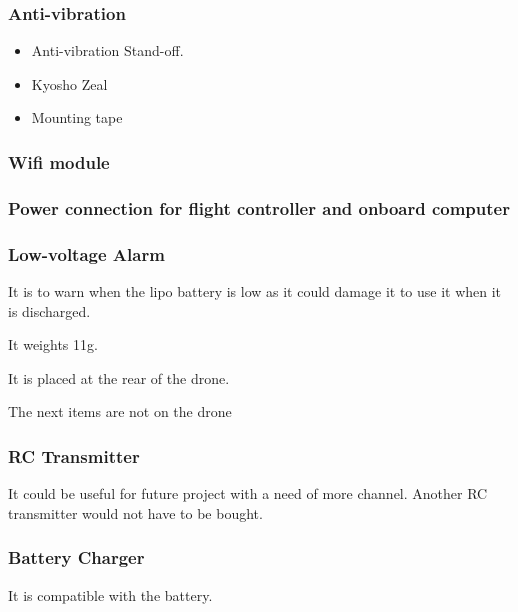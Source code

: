             \subsubsection{Anti-vibration}
                \begin{itemize}
                    \item Anti-vibration Stand-off.
                    
                    \item Kyosho Zeal
                    \item Mounting tape
                \end{itemize}
                
            \subsubsection{Wifi module}
            
            \subsubsection{Power connection for flight controller and onboard computer}
                
            \subsubsection{Low-voltage Alarm}
                It is to warn when the lipo battery is low as it could damage it to use it when it is discharged.
                
                It weights 11g.
                
                It is placed at the rear of the drone.
                
            {\color{blue}The next items are not on the drone}
                
            \subsubsection{RC Transmitter}
                It could be useful for future project with a need of more channel. Another RC transmitter would not have to be bought.
                
            \subsubsection{Battery Charger}
                It is compatible with the battery.
                
